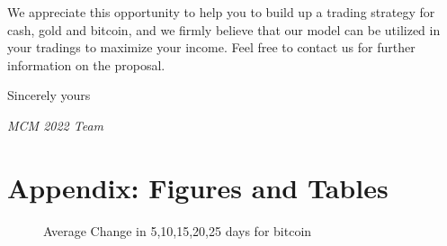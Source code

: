\documentclass[12pt,a4paper]{article}
\begin{document}
\begin{spacing}{1.2}
We appreciate this opportunity to help you to build up a trading strategy for cash, gold and bitcoin, and we firmly believe that our model can be utilized in your tradings to maximize your income. Feel free to contact us for further information on the proposal.

Sincerely yours

\textit{MCM 2022 Team}



\end{spacing}


\newpage
\appendix
\addtocounter{page}{-1}
\thispagestyle{empty}

\section*{Appendix: Figures and Tables}
\label{sec:AppendixFT}

\begin{figure}[H]
	\caption{ Average Change in 5,10,15,20,25 days for bitcoin}
	\label{figure:bitcoin_ac}
\end{figure}
\end{document}
